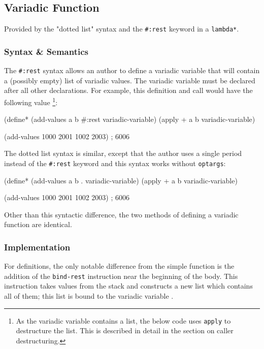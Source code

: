 \subsection{Variadic Function}
Provided by the "dotted list" syntax and the \texttt{\#:rest} keyword in a
\texttt{lambda*}.

\subsubsection{Syntax \& Semantics}
The \texttt{\#:rest} syntax allows an author to define a variadic variable that will
contain a (possibly empty) list of variadic values.
The variadic variable must be declared after all other declarations.
For example, this definition and call would have the following value
\footnote{
	As the variadic variable contains a list, the below code uses \texttt{apply} to
	destructure the list.
	This is described in detail in the section on caller destructuring.
}:

\begin{pygmented}[lang=lisp]
(define* (add-values a b #:rest variadic-variable)
	(apply + a b variadic-variable)

(add-values 1000 2001 1002 2003)
; 6006
\end{pygmented}

The dotted list syntax is similar, except that the author uses a single period instead of
the \texttt{\#:rest} keyword and this syntax works without \texttt{optargs}:

\begin{pygmented}[lang=lisp]
(define* (add-values a b . variadic-variable)
	(apply + a b variadic-variable)

(add-values 1000 2001 1002 2003)
; 6006
\end{pygmented}

Other than this syntactic difference, the two methods of defining a variadic function are
identical.

\subsubsection{Implementation}
For definitions, the only notable difference from the simple function is the addition of
the \texttt{bind-rest} instruction near the beginning of the body.
This instruction takes values from the stack and constructs a new list which contains all
of them; this list is bound to the variadic variable
\parencite[][libguile/vm-engine.c lines 756-783,
             libguile/vm.c        lines 1041-1052]{guile-source}.

